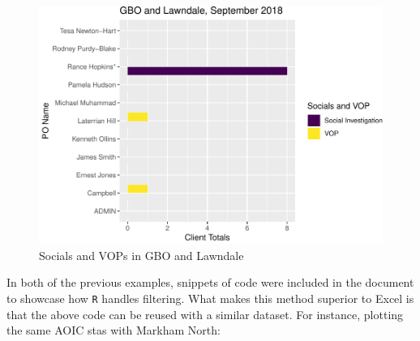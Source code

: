 \documentclass[12pt,]{article}
\begin{document}
\begin{figure}
\centering
\includegraphics{reporting_updates_files/figure-latex/SI_VOP-1.pdf}
\caption{Socials and VOPs in GBO and Lawndale}
\end{figure}

In both of the previous examples, snippets of code were included in the
document to showcase how \texttt{R} handles filtering. What makes this
method superior to Excel is that the above code can be reused with a
similar dataset. For instance, plotting the same AOIC stas with Markham
North:
\end{document}
